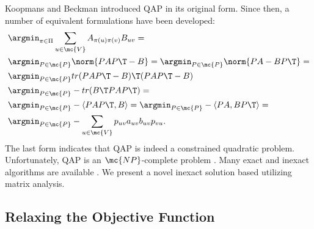 \documentclass[10pt,journal,cspaper,compsoc]{IEEEtran}
\newcommand{\PmcP}{P \in \mc{P}}
\begin{document}
Koopmans and Beckman \cite{Koopmans} introduced QAP in its original form.  Since then, a number of equivalent formulations have been developed:
\begin{align}
	 &\argmin_{\pi \in \Pi} \sum_{u \in \mc{V}} A_{\pi(u) \pi(v)} B_{uv} =\nonumber\\
	&\argmin_{\PmcP} \norm{PAP\T - B} =
	\argmin_{\PmcP} \norm{PA - BP\T} =\nonumber\\
	&\argmin_{\PmcP} tr(PAP\T - B)\T (PAP\T - B) \nonumber \\
	&\argmin_{\PmcP} - tr(B\T PAP\T)=\nonumber\\ %
	&\argmin_{\PmcP}  -\langle PAP\T, B \rangle =
	\argmin_{\PmcP}  -\langle PA, BP\T \rangle =\nonumber\\
	&\argmin_{\PmcP}  -\sum_{u \in \mc{V}} p_{uv} a_{uv} b_{uv} p_{vu}. \label{eq:qap}
\end{align}
The last form indicates that QAP is indeed a constrained quadratic problem.  Unfortunately, QAP is an $\mc{NP}$-complete problem \cite{Garey1979}.   Many exact and inexact algorithms are available \cite{Burkard2009}.  We present a novel inexact solution based utilizing matrix analysis.


\subsection{Relaxing the Objective Function} %
\label{sub:relaxing_the_objective_function}

\end{document}
